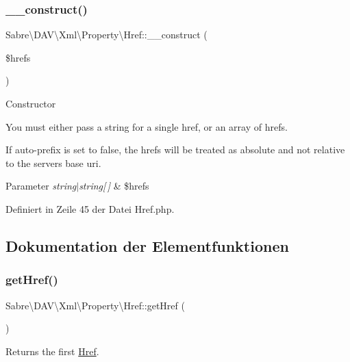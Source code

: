 \subsubsection{\texorpdfstring{\+\_\+\+\_\+construct()}{\_\_construct()}}
{\footnotesize\ttfamily Sabre\textbackslash{}\+D\+A\+V\textbackslash{}\+Xml\textbackslash{}\+Property\textbackslash{}\+Href\+::\+\_\+\+\_\+construct (\begin{DoxyParamCaption}\item[{}]{\$hrefs }\end{DoxyParamCaption})}

Constructor

You must either pass a string for a single href, or an array of hrefs.

If auto-\/prefix is set to false, the hrefs will be treated as absolute and not relative to the servers base uri.


\begin{DoxyParams}{Parameter}
{\em string$\vert$string\mbox{[}$\,$\mbox{]}} & \$hrefs \\
\hline
\end{DoxyParams}


Definiert in Zeile 45 der Datei Href.\+php.



\subsection{Dokumentation der Elementfunktionen}
\mbox{\label{class_sabre_1_1_d_a_v_1_1_xml_1_1_property_1_1_href_a62a6f5fdaafccc9247f8ca9618c6174f}} 
\subsubsection{\texorpdfstring{get\+Href()}{getHref()}}
{\footnotesize\ttfamily Sabre\textbackslash{}\+D\+A\+V\textbackslash{}\+Xml\textbackslash{}\+Property\textbackslash{}\+Href\+::get\+Href (\begin{DoxyParamCaption}{ }\end{DoxyParamCaption})}

Returns the first \mbox{\hyperlink{class_sabre_1_1_d_a_v_1_1_xml_1_1_property_1_1_href}{Href}}.

